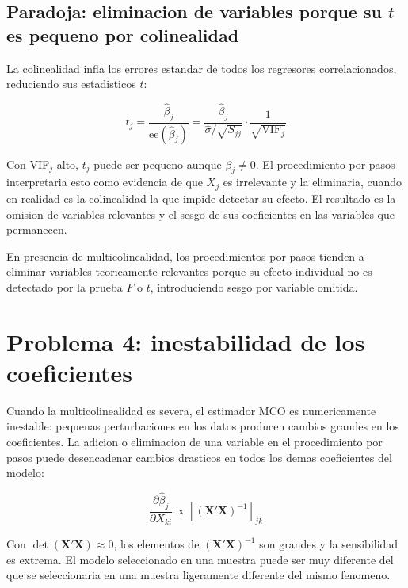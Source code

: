 \documentclass[12pt, letterpaper]{article}
\theoremstyle{remark}
\begin{document}
\subsection{Paradoja: eliminacion de variables porque su $t$ es pequeno por colinealidad}

La colinealidad infla los errores estandar de todos los regresores
correlacionados, reduciendo sus estadisticos $t$:

\begin{equation}
  t_j = \frac{\hat\beta_j}{\text{ee}(\hat\beta_j)}
       = \frac{\hat\beta_j}{\hat\sigma/\sqrt{S_{jj}}} \cdot \frac{1}{\sqrt{\text{VIF}_j}}
  \label{eq:t_VIF}
\end{equation}

Con VIF$_j$ alto, $t_j$ puede ser pequeno aunque $\beta_j \neq 0$. El
procedimiento por pasos interpretaria esto como evidencia de que $X_j$ es
irrelevante y la eliminaria, cuando en realidad es la colinealidad la que
impide detectar su efecto. El resultado es la omision de variables relevantes
y el sesgo de sus coeficientes en las variables que permanecen.

\begin{clave}
  En presencia de multicolinealidad, los procedimientos por pasos tienden a
  eliminar variables teoricamente relevantes porque su efecto individual no
  es detectado por la prueba $F$ o $t$, introduciendo sesgo por variable omitida.
\end{clave}

\section{Problema 4: inestabilidad de los coeficientes}

Cuando la multicolinealidad es severa, el estimador MCO es numericamente
inestable: pequenas perturbaciones en los datos producen cambios grandes
en los coeficientes. La adicion o eliminacion de una variable en el
procedimiento por pasos puede desencadenar cambios drasticos en todos los
demas coeficientes del modelo:

\begin{equation}
  \frac{\partial \hat\beta_j}{\partial X_{ki}}
  \propto [(\mathbf{X'X})^{-1}]_{jk}
  \label{eq:sensibilidad}
\end{equation}

Con $\det(\mathbf{X'X}) \approx 0$, los elementos de $(\mathbf{X'X})^{-1}$
son grandes y la sensibilidad es extrema. El modelo seleccionado en una
muestra puede ser muy diferente del que se seleccionaria en una muestra
ligeramente diferente del mismo fenomeno.
\end{document}
